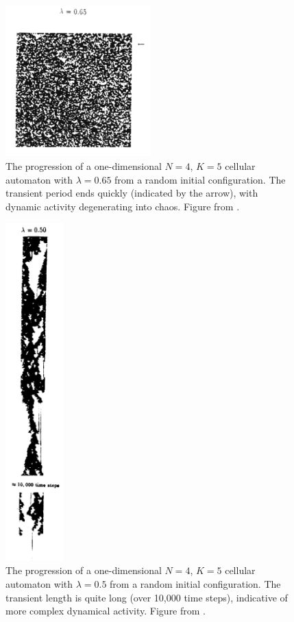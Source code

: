 \documentclass[a4paper,11pt]{report}
\begin{document}
\begin{figure}[htp]
\centering
\includegraphics[width=0.5\textwidth]{chaos_transient.png}
\caption[Chaotic CA Transient Length]{
The progression of a one-dimensional $N=4$, $K=5$ cellular automaton with $\lambda=0.65$ from a random initial configuration. The transient period ends quickly (indicated by the arrow), with dynamic activity degenerating into chaos. Figure from \citeauthor{la90} \cite{la90}.
}
\label{fig:chaos_trans}
\end{figure}

\begin{figure}[htp]
\centering
\includegraphics[width=0.20\textwidth]{long_transient.png}
\caption[Complex CA Transient Length]{
The progression of a one-dimensional $N=4$, $K=5$ cellular automaton with $\lambda=0.5$ from a random initial configuration. The transient length is quite long (over 10,000 time steps), indicative of more complex dynamical activity. Figure from \citeauthor{la90} \cite{la90}.
}
\label{fig:long_trans}
\end{figure}
\end{document}
